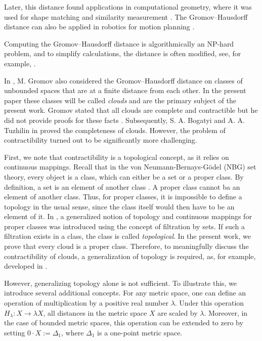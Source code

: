 \documentclass[leqno]{article}
\begin{document}
Later, this distance found applications in computational geometry,
where it was used for shape matching and similarity measurement
\cite{memoli1}. The Gromov--Hausdorff distance can also be applied in
robotics for motion planning \cite{robotics}.

Computing the Gromov--Hausdorff distance is algorithmically an
NP-hard problem, and to simplify calculations, the distance is often
modified, see, for example, \cite{memoli2}.

In \cite{Gromov99}, M. Gromov also considered the Gromov--Hausdorff
distance on classes of unbounded spaces that are at a finite distance
from each other. In the present paper these classes will be called
\emph{clouds} and are the primary subject of the present work. Gromov
stated that all clouds are complete and contractible but he did not
provide proofs for these facts \cite{Gromov99}. Subsequently, S. A.
Bogatyi and A. A. Tuzhilin in \cite{TuzhBog1} proved the completeness
of clouds. However, the problem of contractibility turned out to be
significantly more challenging.

First, we note that contractibility is a topological concept, as it
relies on continuous mappings. Recall that in the von
Neumann-Bernays-G\"odel (NBG) set theory, every object is a class,
which can either be a set or a proper class. By definition, a set is
an element of another class \cite{Neumann, Bernays, Godel}. A proper
class cannot ba an element of another class. Thus, for proper
classes, it is impossible to define a topology in the usual sense,
since the class itself would then have to be an element of it. In
\cite{BorIvTuzh1}, a generalized notion of topology and continuous
mappings for proper classes was introduced using the concept of
filtration by sets. If such a filtration exists in a class, the class
is called \emph{topological}. In the present work, we prove that
every cloud is a proper class. Therefore, to meaningfully discuss the
contractibility of clouds, a generalization of topology is required,
as, for example, developed in \cite{BorIvTuzh1}.

However, generalizing topology alone is not sufficient. To illustrate
this, we introduce several additional concepts.
For any metric space, one can define an operation of multiplication
by a positive real number $\lambda$. Under this operation
$H_{\lambda}\colon X \to \lambda X$, all distances in the metric
space $X$ are scaled by $\lambda$. Moreover, in the case of bounded
metric spaces, this operation can be extended to zero by setting $0
\cdot X := \Delta_1$, where $\Delta_1$ is a one-point metric space.
\end{document}
